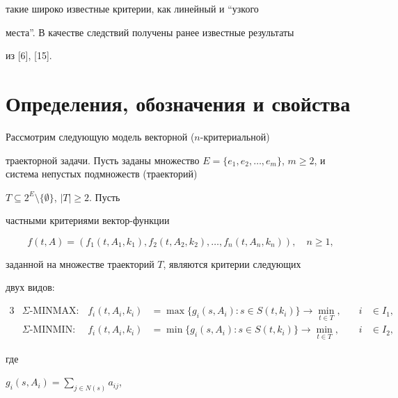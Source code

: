 такие широко известные критерии, как линейный и ``узкого


места''. В качестве следствий получены ранее известные результаты


из [6], [15].








\section{Определения, обозначения и свойства}





Рассмотрим следующую модель векторной ($n$-критериальной)


траекторной задачи. Пусть заданы множество $E=\{e_1,e_2,\dotsc,


e_m\}$, $m\geq 2$, и система непустых подмножеств (траекторий)


$T\subseteq 2^E\setminus \{ \emptyset \}$, $|T|\geq 2$. Пусть


частными критериями вектор-функции


$$


f(t, A)=(f_1(t, A_1, k_1), f_2(t, A_2, k_2),\dotsc, f_n(t,


A_n, k_n)),\quad n\geq 1,


$$


заданной на множестве траекторий $T$, являются критерии следующих


двух видов:


\begin{alignat}{3} \label{f1}


&\Sigma \text{-MINMAX:} & \ \ f_i(t, A_i, k_i)&=\max\{g_i(s, A_i):


 s \in S( t, k_i) \}


\longrightarrow \min_{t \in T},&\quad i &\in I_1, \\


%


\label{f2}


&\Sigma \text{-MINMIN:}& \ \ f_i(t, A_i, k_i)&=\min\{g_i(s, A_i)


:s \in S( t, k_i) \}


\longrightarrow \min_{t \in T}, &\quad i &\in I_2,


\end{alignat}


где


$g_i(s, A_i)= \sum\limits_{j\in N(s)} a_{ij}$,


